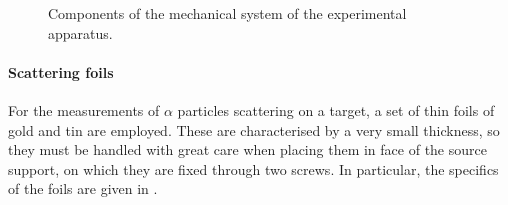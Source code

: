 \documentclass[../../main/main.tex]{subfiles}
\begin{document}
\begin{figure}[h]
\begin{minipage}[c]{0.33\linewidth}
{        }%
    \end{minipage}%
    \hfill%
    \begin{minipage}[c]{0.33\linewidth}
        \vspace{0pt}
        \centering
    \end{minipage}%
    \label{fig:mechanical_components}
    \caption{Components of the mechanical system of the experimental apparatus.}
\end{figure}



\paragraph{Scattering foils}
For the measurements of \( \alpha \) particles scattering on a target, a set of thin foils of gold and tin are employed. These are characterised by a very small thickness, so they must be handled with great care when placing them in face of the source support, on which they are fixed through two screws. In particular, the specifics of the foils are given in .
\end{document}
